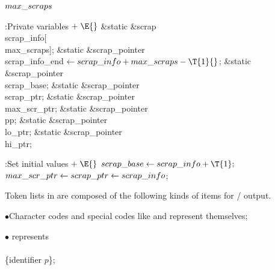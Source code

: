 \B\D$\\{max\_scraps}$ \5
\par
\Y\B\4:Private variables\X${}\mathrel+\E{}$\6
\&{static} \&{scrap} \\{scrap\_info}[\\{max\_scraps}];\6
\&{static} \&{scrap\_pointer} \\{scrap\_info\_end}${}\K\\{scrap\_info}+\\{max%
\_scraps}-\T{1}{}$;\6
\&{static} \&{scrap\_pointer} \\{scrap\_base};\6
\&{static} \&{scrap\_pointer} \\{scrap\_ptr};\6
\&{static} \&{scrap\_pointer} \\{max\_scr\_ptr};\6
\&{static} \&{scrap\_pointer} \\{pp};\6
\&{static} \&{scrap\_pointer} \\{lo\_ptr};\6
\&{static} \&{scrap\_pointer} \\{hi\_ptr};\par
\fi

\B{}:Set initial values\X${}\mathrel+\E{}$\6
$\\{scrap\_base}\K\\{scrap\_info}+\T{1};{}$\6
${}\\{max\_scr\_ptr}\leftarrow\\{scrap\_ptr}\leftarrow\\{scrap\_info}{}$;\par
\fi

Token lists in  are composed of the following kinds of
items for \TEX/ output.

\yskip\item{$\bullet$}Character codes and special codes like  and
 represent themselves;

\item{$\bullet$} represents \.{\\\\\{{\rm identifier
$p$}\}};

